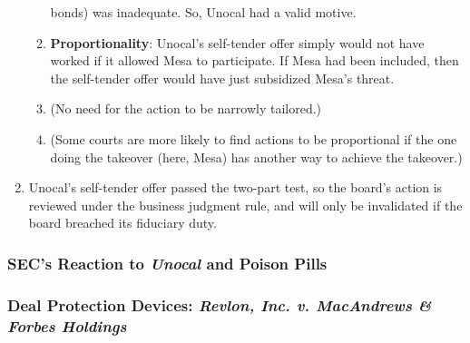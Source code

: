 \begin{enumerate}
\begin{enumerate}
        bonds) was inadequate. So, Unocal had a valid motive.
        \item \textbf{Proportionality}: Unocal's self-tender offer simply would 
        not have worked if it allowed Mesa to participate. If Mesa had been 
        included, then the self-tender offer would have just subsidized Mesa's 
        threat.
        \item (No need for the action to be narrowly tailored.)
        \item (Some courts are more likely to find actions to be proportional if 
        the one doing the takeover (here, Mesa) has another way to achieve the 
        takeover.)
    \end{enumerate}
    \item Unocal's self-tender offer passed the two-part test, so the board's 
    action is reviewed under the business judgment rule, and will only be 
    invalidated if the board breached its fiduciary duty.
\end{enumerate}

\subsubsection{SEC's Reaction to \emph{Unocal} and Poison Pills}

%

\subsubsection{Deal Protection Devices: \emph{Revlon, Inc. v. MacAndrews \& 
Forbes Holdings}}


